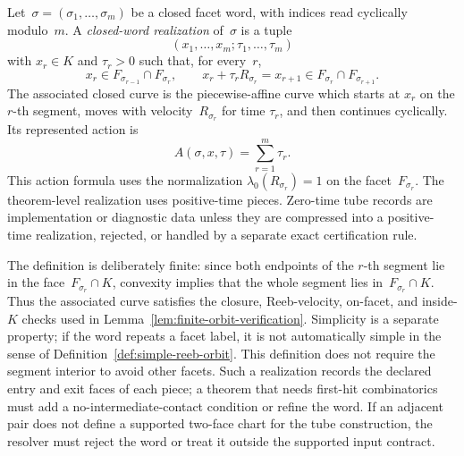 \begin{unverified}
\begin{definition}%
\label{def:flow-graph-closed-word-realization}
Let~$\sigma=(\sigma_1,\ldots,\sigma_m)$ be a closed facet word, with indices
read cyclically modulo~$m$.  A \emph{closed-word realization} of~$\sigma$ is a
tuple
\[
  (x_1,\ldots,x_m;\tau_1,\ldots,\tau_m)
\]
with $x_r\in K$ and $\tau_r>0$ such that, for every~$r$,
\[
  x_r\in F_{\sigma_{r-1}}\cap F_{\sigma_r},\qquad
  x_r+\tau_r R_{\sigma_r}=x_{r+1}\in
  F_{\sigma_r}\cap F_{\sigma_{r+1}} .
\]
The associated closed curve is the piecewise-affine curve which starts at
$x_r$ on the $r$-th segment, moves with velocity~$R_{\sigma_r}$ for time
$\tau_r$, and then continues cyclically.  Its represented action is
\[
  A(\sigma,x,\tau)=\sum_{r=1}^m \tau_r .
\]
This action formula uses the normalization
$\lambda_0(R_{\sigma_r})=1$ on the facet~$F_{\sigma_r}$.
The theorem-level realization uses positive-time pieces.  Zero-time tube
records are implementation or diagnostic data unless they are compressed into a
positive-time realization, rejected, or handled by a separate exact
certification rule.

The definition is deliberately finite: since both endpoints of the $r$-th
segment lie in the face~$F_{\sigma_r}\cap K$, convexity implies that the whole
segment lies in~$F_{\sigma_r}\cap K$.  Thus the associated curve satisfies the
closure, Reeb-velocity, on-facet, and inside-$K$ checks used in
Lemma~\ref{lem:finite-orbit-verification}.  Simplicity is a separate property;
if the word repeats a facet label, it is not automatically simple in the sense
of Definition~\ref{def:simple-reeb-orbit}.  This definition does not require
the segment interior to avoid other facets.  Such a realization records the
declared entry and exit faces of each piece; a theorem that needs first-hit
combinatorics must add a no-intermediate-contact condition or refine the word.
If an adjacent pair does not define a supported two-face chart for the tube
construction, the resolver must reject the word or treat it outside the
supported input contract.
\end{definition}
\end{unverified}

